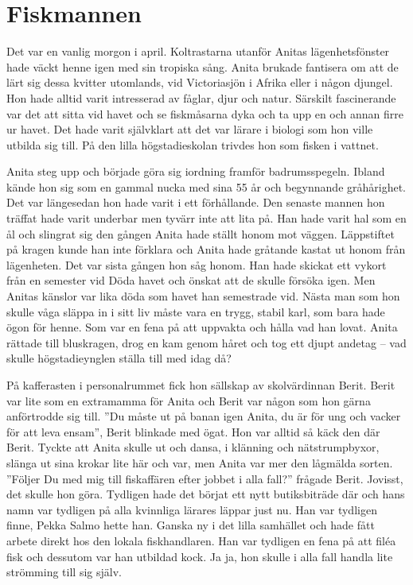 \chapter[fiskmannen]{Fiskmannen}

Det var en vanlig morgon i april. Koltrastarna utanför Anitas lägenhetsfönster hade väckt henne igen med sin tropiska sång. Anita brukade fantisera om att de lärt sig dessa kvitter utomlands, vid Victoriasjön i Afrika eller i någon djungel. Hon hade alltid varit intresserad av fåglar, djur och natur. Särskilt fascinerande var det att sitta vid havet och se fiskmåsarna dyka och ta upp en och annan firre ur havet. Det hade varit självklart att det var lärare i biologi som hon ville utbilda sig till. På den lilla högstadieskolan trivdes hon som fisken i vattnet.

Anita steg upp och började göra sig iordning framför badrumsspegeln. Ibland kände hon sig som en gammal nucka med sina 55 år och begynnande gråhårighet. Det var längesedan hon hade varit i ett förhållande. Den senaste mannen hon träffat hade varit underbar men tyvärr inte att lita på. Han hade varit hal som en ål och slingrat sig den gången Anita hade ställt honom mot väggen. Läppstiftet på kragen kunde han inte förklara och Anita hade gråtande kastat ut honom från lägenheten. Det var sista gången hon såg honom. Han hade skickat ett vykort från en semester vid Döda havet och önskat att de skulle försöka igen. Men Anitas känslor var lika döda som havet han semestrade vid. Nästa man som hon skulle våga släppa in i sitt liv måste vara en trygg, stabil karl, som bara hade ögon för henne. Som var en fena på att uppvakta och hålla vad han lovat. Anita rättade till bluskragen, drog en kam genom håret och tog ett djupt andetag – vad skulle högstadieynglen ställa till med idag då?

På kafferasten i personalrummet fick hon sällskap av skolvärdinnan Berit. Berit var lite som en extramamma för Anita och Berit var någon som hon gärna anförtrodde sig till. ”Du måste ut på banan igen Anita, du är för ung och vacker för att leva ensam”, Berit blinkade med ögat. Hon var alltid så käck den där Berit. Tyckte att Anita skulle ut och dansa, i klänning och nätstrumpbyxor, slänga ut sina krokar lite här och var, men Anita var mer den lågmälda sorten. ”Följer Du med mig till fiskaffären efter jobbet i alla fall?” frågade Berit. Jovisst, det skulle hon göra. Tydligen hade det börjat ett nytt butiksbiträde där och hans namn var tydligen på alla kvinnliga lärares läppar just nu. Han var tydligen finne, Pekka Salmo hette han. Ganska ny i det lilla samhället och hade fått arbete direkt hos den lokala fiskhandlaren. Han var tydligen en fena på att filéa fisk och dessutom var han utbildad kock. Ja ja, hon skulle i alla fall handla lite strömming till sig själv.

